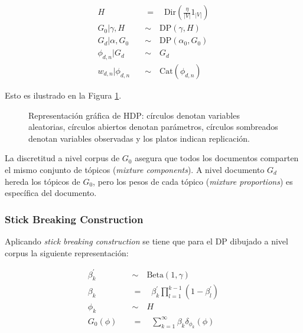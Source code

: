 \begin{align}
   H \quad &= \quad \text{Dir}(\frac{\eta}{|V|}1_{|V|})\\
   G_{0}|\gamma, H \quad &\sim \quad \text{DP}(\gamma, H)\\
   G_{d}|\alpha, G_{0} \quad &\sim \quad \text{DP}(\alpha_{0}, G_{0})\\
   \phi_{d,n}|G_{d} \quad &\sim \quad G_{d}\\
   w_{d,n}|\phi_{d,n} \quad &\sim \quad \text{Cat}(\phi_{d,n})
\end{align}

Esto es ilustrado en la Figura \ref{img:hdp}.

\begin{figure}
  \centering
\caption{Representación gráfica de HDP: círculos denotan variables aleatorias, círculos abiertos denotan parámetros, círculos sombreados denotan variables observadas y los platos indican replicación.}
\label{img:hdp}
\end{figure}

La discretitud a nivel corpus de $G_{0}$ asegura que todos los documentos comparten el mismo conjunto de tópicos (\textit{mixture components}). A nivel documento $G_{d}$ hereda los tópicos de $G_{0}$, pero los pesos de cada tópico (\textit{mixture proportions}) es específica del documento.\\


\subsubsection{Stick Breaking Construction}
Aplicando \textit{stick breaking construction} se tiene que para el DP dibujado a nivel corpus la siguiente representación:

\begin{align}
    \beta_{k}^{'} \quad &\sim \quad \text{Beta}(1, \gamma) \\
    \beta_{k} \quad &= \quad \beta_{k}^{'}\prod_{l=1}^{k-1}(1-\beta_{l}^{'})\\
    \phi_{k} \quad &\sim \quad H  \\
    G_{0}(\phi) \quad &= \quad \sum_{k=1}^{\infty}\beta_{k}\delta_{\phi_{k}}(\phi)
\end{align}

